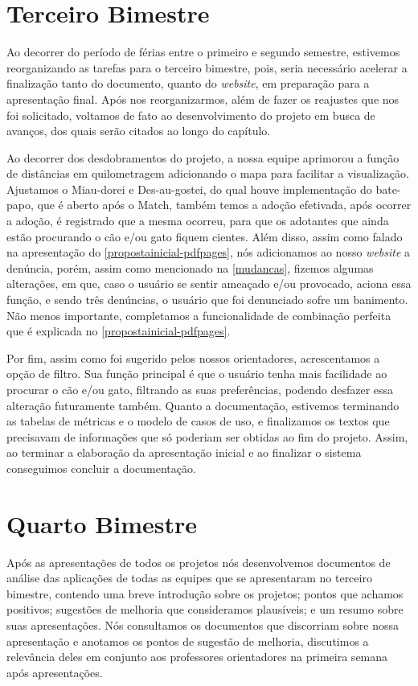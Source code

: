 \section{Terceiro Bimestre}
Ao decorrer do período de férias entre o primeiro e segundo semestre, estivemos reorganizando as tarefas para o terceiro bimestre, pois, seria necessário acelerar a finalização tanto do documento, quanto do \textit{website}, em preparação para a apresentação final. Após nos reorganizarmos, além de fazer os reajustes que nos foi solicitado, voltamos de fato ao desenvolvimento do projeto em busca de avanços, dos quais serão citados ao longo do capítulo.

Ao decorrer dos desdobramentos do projeto, a nossa equipe aprimorou a função de distâncias em quilometragem adicionando o mapa para facilitar a visualização. Ajustamos o \gls{Miau-dorei} e \gls{Des-au-gostei}, do qual houve implementação do bate-papo, que é aberto após o \gls{Match}, também temos a adoção efetivada, após ocorrer a adoção, é registrado que a mesma ocorreu, para que os adotantes que ainda estão procurando o cão e/ou gato fiquem cientes. Além disso, assim como falado na apresentação do \autoref{propostainicial-pdfpages}, nós adicionamos ao nosso \textit{website} a denúncia, porém, assim como mencionado na \autoref{mudancas}, fizemos algumas alterações, em que, caso o usuário se sentir ameaçado e/ou provocado, aciona essa função, e sendo três denúncias, o usuário que foi denunciado sofre um banimento. Não menos importante, completamos a funcionalidade de combinação perfeita que é explicada no \autoref{propostainicial-pdfpages}.

Por fim, assim como foi sugerido pelos nossos orientadores, acrescentamos a opção de filtro. Sua função principal é que o usuário tenha mais facilidade ao procurar o cão e/ou gato, filtrando as suas preferências, podendo desfazer essa alteração futuramente também. Quanto a documentação, estivemos terminando as tabelas de métricas e o modelo de casos de uso, e finalizamos os textos que precisavam de informações que só poderiam ser obtidas ao fim do projeto. Assim, ao terminar a elaboração da apresentação inicial e ao finalizar o sistema conseguimos concluir a documentação.

\section{Quarto Bimestre}
Após as apresentações de todos os projetos nós desenvolvemos documentos de análise das aplicações de todas as equipes que se apresentaram no terceiro bimestre, contendo uma breve introdução sobre os projetos; pontos que achamos positivos; sugestões de melhoria que consideramos plausíveis; e um resumo sobre suas apresentações. Nós consultamos os documentos que discorriam sobre nossa apresentação e anotamos os pontos de sugestão de melhoria, discutimos a relevância deles em conjunto aos professores orientadores na primeira semana após apresentações.

